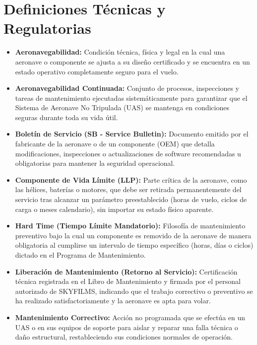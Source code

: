 \section*{Definiciones Técnicas y Regulatorias}

\begin{itemize}
    \item \textbf{Aeronavegabilidad:} Condición técnica, física y legal en la cual una aeronave o componente se ajusta a su diseño certificado y se encuentra en un estado operativo completamente seguro para el vuelo.
    
    \item \textbf{Aeronavegabilidad Continuada:} Conjunto de procesos, inspecciones y tareas de mantenimiento ejecutadas sistemáticamente para garantizar que el Sistema de Aeronave No Tripulada (UAS) se mantenga en condiciones seguras durante toda su vida útil.
    
    \item \textbf{Boletín de Servicio (SB - Service Bulletin):} Documento emitido por el fabricante de la aeronave o de un componente (OEM) que detalla modificaciones, inspecciones o actualizaciones de software recomendadas u obligatorias para mantener la seguridad operacional.
    
    \item \textbf{Componente de Vida Límite (LLP):} Parte crítica de la aeronave, como las hélices, baterías o motores, que debe ser retirada permanentemente del servicio tras alcanzar un parámetro preestablecido (horas de vuelo, ciclos de carga o meses calendario), sin importar su estado físico aparente.
    
    \item \textbf{Hard Time (Tiempo Límite Mandatorio):} Filosofía de mantenimiento preventivo bajo la cual un componente es removido de la aeronave de manera obligatoria al cumplirse un intervalo de tiempo específico (horas, días o ciclos) dictado en el Programa de Mantenimiento.
    
    \item \textbf{Liberación de Mantenimiento (Retorno al Servicio):} Certificación técnica registrada en el Libro de Mantenimiento y firmada por el personal autorizado de SKYFILMS, indicando que el trabajo correctivo o preventivo se ha realizado satisfactoriamente y la aeronave es apta para volar.
    
    \item \textbf{Mantenimiento Correctivo:} Acción no programada que se efectúa en un UAS o en sus equipos de soporte para aislar y reparar una falla técnica o daño estructural, restableciendo sus condiciones normales de operación.
    

\end{itemize}
